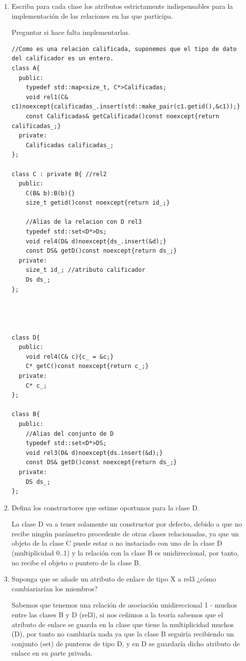 \begin{enumerate}[label = \alph*)]
  \item Escriba para cada clase los atributos estrictamente indispensables para la implementación de las relaciones en las que participa.
  
  Preguntar si hace falta implementarlas.
  \begin{verbatim}
//Como es una relacion calificada, suponemos que el tipo de dato del calificador es un entero.
class A{
  public:
    typedef std::map<size_t, C*>Calificadas;
    void rel1(C& c1)noexcept{calificadas_.insert(std::make_pair(c1.getid(),&c1));}
    const Calificadas& getCalificada()const noexcept{return calificadas_;}
  private:
    Calificadas calificadas_;
};

class C : private B{ //rel2
  public:
    C(B& b):B(b){}
    size_t getid()const noexcept{return id_;}

    //Alias de la relacion con D rel3
    typedef std::set<D*>Ds;
    void rel4(D& d)noexcept{ds_.insert(&d);}
    const DS& getD()const noexcept{return ds_;}
  private:
    size_t id_; //atributo calificador
    Ds ds_;
};




class D{
  public:
    void rel4(C& c){c_ = &c;}
    C* getC()const noexcept{return c_;}
  private:
    C* c_;
};

class B{
  public:
    //Alias del conjunto de D
    typedef std::set<D*>DS;
    void rel3(D& d)noexcept{ds.insert(&d);}
    const DS& getD()const noexcept{return ds_;}
  private:
    DS ds_;
};   
  \end{verbatim}
  \item Defina los constructores que estime oportunos para la clase D.
  
  La clase D va a tener solamente un constructor por defecto, debido a que no recibe ningún parámetro procedente de otras clases relacionadas, ya que un objeto de la clase C puede estar o no instaciado con uno de la clase D (multiplicidad 0..1) y la relación con la clase B es unidireccional, por tanto, no recibe el objeto o puntero de la clase B.

  \item Suponga que se añade un atributo de enlace de tipo X a rel3 ¿cómo cambiariarían los miembros?
   
  Sabemos que tenemos una relación de asociación unidireccional 1 - muchos entre las clases B y D (rel3), si nos ceñimos a la teoría sabemos que el atributo de enlace se guarda en la clase que tiene la multiplicidad muchos (D), por tanto no cambiaría nada ya que la clase B seguiría recibiendo un conjunto (set) de punteros de tipo D, y en D se guardaría dicho atributo de enlace en su parte privada.
\end{enumerate}

